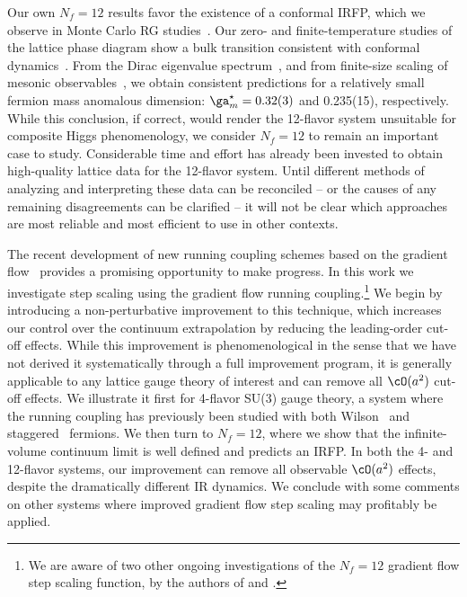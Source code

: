 Our own $N_f = 12$ results favor the existence of a conformal IRFP, which we observe in Monte Carlo RG studies~\cite{Hasenfratz:2011xn, Petropoulos:2013gaa}.
Our zero- and finite-temperature studies of the lattice phase diagram show a bulk transition consistent with conformal dynamics~\cite{Schaich:2012fr, Hasenfratz:2013uha}.
From the Dirac eigenvalue spectrum~\cite{Cheng:2013eu}, and from finite-size scaling of mesonic observables~\cite{Cheng:2013xha}, we obtain consistent predictions for a relatively small fermion mass anomalous dimension: $\ga_m^{\star} = 0.32(3)$ and 0.235(15), respectively.
While this conclusion, if correct, would render the 12-flavor system unsuitable for composite Higgs phenomenology, we consider $N_f = 12$ to remain an important case to study.
Considerable time and effort has already been invested to obtain high-quality lattice data for the 12-flavor system.
Until different methods of analyzing and interpreting these data can be reconciled -- or the causes of any remaining disagreements can be clarified -- it will not be clear which approaches are most reliable and most efficient to use in other contexts.

The recent development of new running coupling schemes based on the gradient flow~\cite{Luscher:2009eq, Luscher:2010iy, Fodor:2012td, Fodor:2012qh, Fritzsch:2013je} provides a promising opportunity to make progress.
In this work we investigate step scaling using the gradient flow running coupling.\footnote{We are aware of two other ongoing investigations of the $N_f = 12$ gradient flow step scaling function, by the authors of  and .}
We begin by introducing a non-perturbative improvement to this technique, which increases our control over the continuum extrapolation by reducing the leading-order cut-off effects.
While this improvement is phenomenological in the sense that we have not derived it systematically through a full improvement program, it is generally applicable to any lattice gauge theory of interest and can remove all $\cO(a^2)$ cut-off effects.
We illustrate it first for 4-flavor SU(3) gauge theory, a system where the running coupling has previously been studied with both Wilson~\cite{Tekin:2010mm} and staggered~\cite{PerezRubio:2010ke, Fodor:2012td, Fodor:2012qh} fermions.
We then turn to $N_f = 12$, where we show that the infinite-volume continuum limit is well defined and predicts an IRFP.
In both the 4- and 12-flavor systems, our improvement can remove all observable $\cO(a^2)$ effects, despite the dramatically different IR dynamics.
We conclude with some comments on other systems where improved gradient flow step scaling may profitably be applied.

